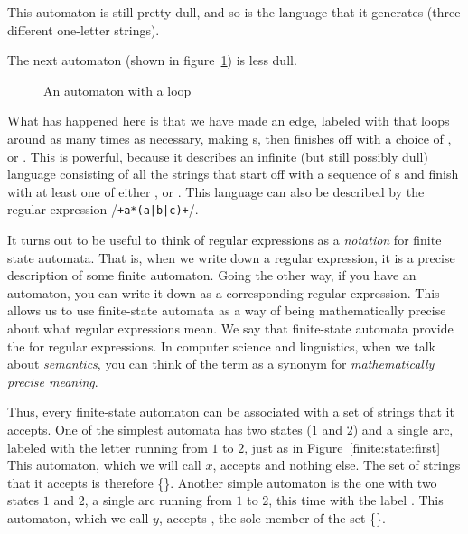 \begin{underthehood}
This automaton is still pretty dull, and so is the language that it
generates (three different one-letter strings).

The next automaton (shown in figure~\ref{finite:state:third}) is less
dull.

\begin{figure}
    \caption{An automaton with a loop}
    \label{finite:state:third}
\end{figure}

What has happened here is that we have made an edge, labeled with
 that loops around as many times as necessary, making s,
then finishes off with a choice of , or . This is
powerful, because it describes an infinite (but still possibly dull)
language consisting of all the strings that start off with a sequence
of s and finish with at least one of either ,  or .
This language can also be described by the regular expression
/\texttt{+a*(a|b|c)+}/.
	
It turns out to be useful to think of regular expressions as a
\emph{notation} for finite state automata. That is, when we write
down a regular expression, it is a precise description of some finite
automaton. Going the other way, if you have an automaton, you can
write it down as a corresponding regular expression. This allows us to
use finite-state automata as a way of being mathematically precise
about what regular expressions mean. We say that finite-state automata
provide the  for regular expressions. In computer
science and linguistics, when we talk about \emph{semantics}, you can
think of the term as a synonym for \emph{mathematically precise meaning}.

	
Thus, every finite-state automaton can be associated with a set of
strings that it accepts. One of the simplest automata has two states
($1$ and $2$) and a single arc, labeled with the letter  running
from $1$ to $2$, just as in Figure~\ref{finite:state:first} 
This automaton, which we will call $x$, accepts  and
nothing else. The set of strings that it accepts is therefore
\{\}. Another simple automaton is the one with two states $1$ and
$2$, a single arc running from $1$ to $2$, this time with the label
. This automaton, which we call $y$, accepts , the sole
member of the set \{\}.


\end{underthehood}
